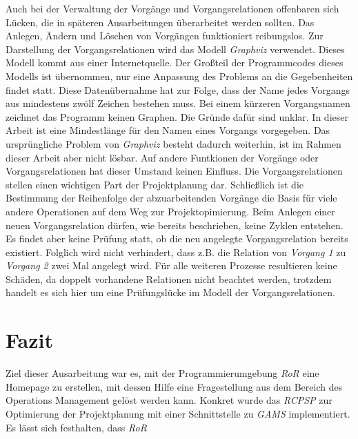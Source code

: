 \documentclass[a4paper,12pt,parskip,bibtotoc,liststotoc]{article}
\begin{document}
Auch bei der Verwaltung der Vorgänge und Vorgangsrelationen offenbaren sich Lücken, die in späteren Ausarbeitungen überarbeitet werden sollten. Das Anlegen, Ändern und Löschen von Vorgängen funktioniert reibungslos. Zur Darstellung der Vorgangsrelationen wird das Modell \textit{Graphviz} verwendet. Dieses Modell kommt aus einer Internetquelle. Der Großteil der Programmcodes dieses Modells ist übernommen, nur eine Anpassung des Problems an die Gegebenheiten findet statt. Diese Datenübernahme hat zur Folge, dass der Name jedes Vorgangs aus mindestens zwölf Zeichen bestehen muss. Bei einem kürzeren Vorgangsnamen zeichnet das Programm keinen Graphen. Die Gründe dafür sind unklar. In dieser Arbeit ist eine Mindestlänge für den Namen eines Vorgangs vorgegeben. Das ursprüngliche Problem von \textit{Graphviz} besteht dadurch weiterhin, ist im Rahmen dieser Arbeit aber nicht lösbar. Auf andere Funtkionen der Vorgänge oder Vorgangsrelationen hat dieser Umstand keinen Einfluss. Die Vorgangsrelationen stellen einen wichtigen Part der Projektplanung dar. Schließlich ist die Bestimmung der Reihenfolge der abzuarbeitenden Vorgänge die Basis für viele andere Operationen auf dem Weg zur Projektopimierung. Beim Anlegen einer neuen Vorgangsrelation dürfen, wie bereits beschrieben, keine Zyklen entstehen. Es findet aber keine Prüfung statt, ob die neu angelegte Vorgangsrelation bereits existiert. Folglich wird nicht verhindert, dass z.B. die Relation von \textit{Vorgang 1} zu \textit{Vorgang 2} zwei Mal angelegt wird. Für alle weiteren Prozesse resultieren keine Schäden, da doppelt vorhandene Relationen nicht beachtet werden, trotzdem handelt es sich hier um eine Prüfungslücke im Modell der Vorgangsrelationen.\\      
  
\section{Fazit} \label{Fazit}
Ziel dieser Ausarbeitung war es, mit der Programmierumgebung \textit{RoR} eine Homepage zu erstellen, mit dessen Hilfe eine Fragestellung aus dem Bereich des Operations Management gelöst werden kann. Konkret wurde das \textit{RCPSP} zur Optimierung der Projektplanung mit einer Schnittstelle zu \textit{GAMS} implementiert. Es lässt sich festhalten, dass \textit{RoR}     


\newpage
\end{document}
